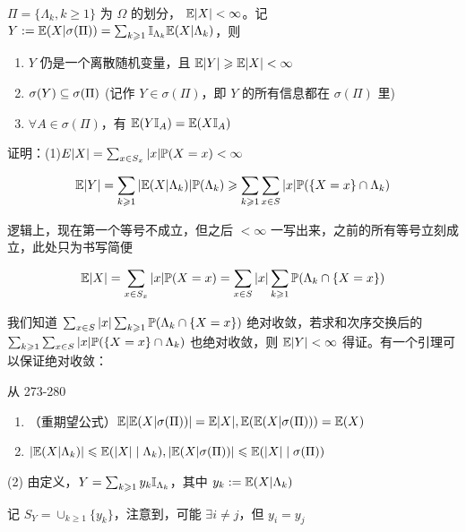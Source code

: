 \begin{theorem}\label{thm:partition_con_exp}
    $\Pi=\{\Lambda_k,k\geq 1\}$ 为 $\Omega$ 的划分， $\mathbb E|X|<\infty$。记 $Y:=\mathbb E(X|\sigma(\Pi))=\sum_{k\geqslant 1}\mathbb I_{\Lambda_k}\mathbb E(X|\Lambda_k)$，则
    \begin{enumerate}
        \item $Y$ 仍是一个离散随机变量，且 $\mathbb E|Y|\geqslant \mathbb E|X|<\infty$
        \item $\sigma(Y)\subseteq \sigma(\Pi)$ (记作 $Y\in \sigma(\Pi)$，即 $Y$ 的所有信息都在 $\sigma(\Pi)$ 里)
        \item $\forall A\in \sigma(\Pi)$，有 $\mathbb E(Y\mathbb I_A)=\mathbb E(X\mathbb I_A)$
    \end{enumerate}
\end{theorem}

证明：(1)$E|X|=\sum_{x\in S_x}|x|\mathbb{P}(X=x)<\infty$

\[
    \mathbb E|Y|=\sum_{k\geqslant 1}|\mathbb E(X|\Lambda_k)|\mathbb{P}(\Lambda_k)\geqslant \sum_{k\geqslant 1}\sum_{x\in S}|x|\mathbb{P}(\{X=x\}\cap \Lambda_k)
\]

逻辑上，现在第一个等号不成立，但之后 $<\infty$ 一写出来，之前的所有等号立刻成立，此处只为书写简便

\[
    \mathbb E|X|=\sum_{x\in S_x}|x|\mathbb{P}(X=x)=\sum_{x\in S}|x|\sum_{k\geqslant 1}\mathbb{P}(\Lambda_k\cap \{X=x\})
\]

我们知道 $\sum_{x\in S}|x|\sum_{k\geqslant 1}\mathbb{P}(\Lambda_k\cap \{X=x\})$ 绝对收敛，若求和次序交换后的 $\sum_{k\geqslant 1}\sum_{x\in S}|x|\mathbb{P}(\{X=x\}\cap \Lambda_k)$ 也绝对收敛，则 $\mathbb E|Y|<\infty$ 得证。有一个引理可以保证绝对收敛：

\begin{lemma}\label{lem:abs_convergence}
    从 273-280
\end{lemma}

\begin{corollary}\label{cor:double_exp}
    \begin{enumerate}
        \item （重期望公式）$\mathbb E|\mathbb E(X|\sigma(\Pi))|=\mathbb E|X|, \mathbb E(\mathbb E(X|\sigma(\Pi)))=\mathbb E(X)$
        \item $|\mathbb E(X|\Lambda_k)|\leqslant \mathbb E(|X|\mid\Lambda_k), |\mathbb E(X|\sigma(\Pi))|\leqslant \mathbb E(|X|\mid\sigma(\Pi))$
    \end{enumerate}
\end{corollary}

(2) 由定义，$Y=\sum_{k\geqslant 1}y_k\mathbb I_{\Lambda_k}$，其中 $y_k:=\mathbb E(X|\Lambda_k)$

记 $S_Y=\cup_{k\geq 1}\{y_k\}$，注意到，可能 $\exists i\neq j$，但 $y_i=y_j$

